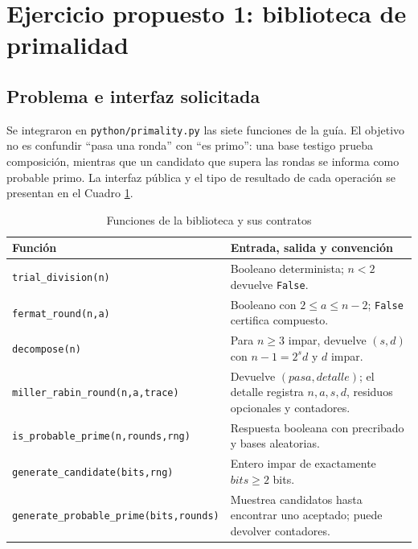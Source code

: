 \section{Ejercicio propuesto 1: biblioteca de primalidad}

\subsection{Problema e interfaz solicitada}
Se integraron en \texttt{python/primality.py} las siete funciones de la guía. El objetivo no es confundir ``pasa una ronda'' con ``es primo'': una base testigo prueba composición, mientras que un candidato que supera las rondas se informa como probable primo. La interfaz pública y el tipo de resultado de cada operación se presentan en el Cuadro \ref{tab:interfaz}.
\begin{table}[H]\centering\small
\caption{Funciones de la biblioteca y sus contratos}\label{tab:interfaz}
\begin{tabularx}{\textwidth}{@{}lX@{}}\toprule
Función & Entrada, salida y convención \\ \midrule
\texttt{trial\_division(n)} & Booleano determinista; $n<2$ devuelve \texttt{False}. \\
\texttt{fermat\_round(n,a)} & Booleano con $2\le a\le n-2$; \texttt{False} certifica compuesto. \\
\texttt{decompose(n)} & Para $n\ge3$ impar, devuelve $(s,d)$ con $n-1=2^sd$ y $d$ impar. \\
\texttt{miller\_rabin\_round(n,a,trace)} & Devuelve $(\textit{pasa},\textit{detalle})$; el detalle registra $n,a,s,d$, residuos opcionales y contadores. \\
\texttt{is\_probable\_prime(n,rounds,rng)} & Respuesta booleana con precribado y bases aleatorias. \\
\texttt{generate\_candidate(bits,rng)} & Entero impar de exactamente $bits\ge2$ bits. \\
\texttt{generate\_probable\_prime(bits,rounds)} & Muestrea candidatos hasta encontrar uno aceptado; puede devolver contadores. \\ \bottomrule
\end{tabularx}\end{table}

